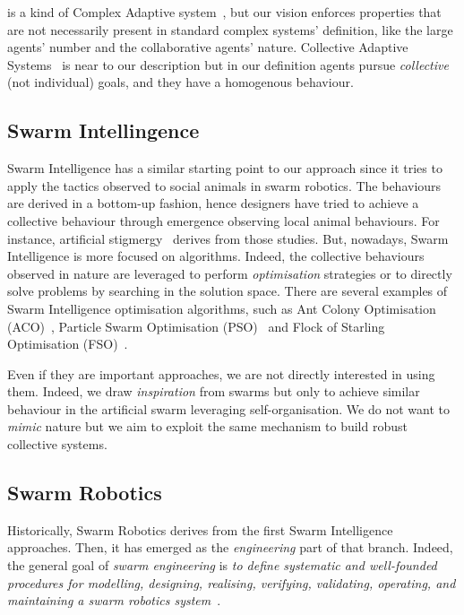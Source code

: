 \documentclass[11pt]{article}
\begin{document}
\cpsw{} is a kind of Complex Adaptive system~\cite{holland1992complex}, but our vision enforces properties that are not necessarily present in standard complex systems' definition, like the large agents' number and the collaborative agents' nature.
Collective Adaptive Systems~\cite{DBLP:journals/corr/abs-1108-5643} is near to our \cpsw{} description but in our definition agents pursue \emph{collective} (not individual) goals, and they have a homogenous behaviour.
\subsection{Swarm Intellingence}
Swarm Intelligence has a similar starting point to our approach since it tries to apply the tactics observed to social animals in swarm robotics. The behaviours are derived in a bottom-up fashion, hence designers have tried to achieve a collective behaviour through emergence observing local animal behaviours.
%
For instance, artificial stigmergy~\cite{DBLP:journals/fgcs/DorigoBT00} derives from those studies. But, nowadays, Swarm Intelligence is more focused on algorithms. 
Indeed, the collective behaviours observed in nature are leveraged to perform \textit{optimisation} strategies or to directly solve problems by searching in the solution space.
There are several examples of Swarm Intelligence optimisation algorithms, such as Ant Colony Optimisation (ACO)~\cite{DBLP:journals/tsmc/DorigoMC96}, Particle Swarm Optimisation (PSO)~\cite{DBLP:conf/icnn/KennedyE95} and Flock of Starling Optimisation (FSO)~\cite{DBLP:series/sci/FulgineiS11}.

Even if they are important approaches, we are not directly interested in using them. Indeed, we draw \textit{inspiration} from swarms but only to achieve similar behaviour in the artificial swarm leveraging self-organisation. We do not want to \textit{mimic} nature but we aim to exploit the same mechanism to build robust collective systems.
\subsection{Swarm Robotics}
Historically, Swarm Robotics derives from the first Swarm Intelligence approaches. Then, it has emerged as the \textit{engineering} part of that branch. Indeed, the general goal of \emph{swarm engineering} is \emph{to define systematic and well-founded procedures for modelling, designing, realising, verifying, validating, operating, and maintaining a swarm robotics system}~\cite{DBLP:journals/swarm/BrambillaFBD13}.
\end{document}
